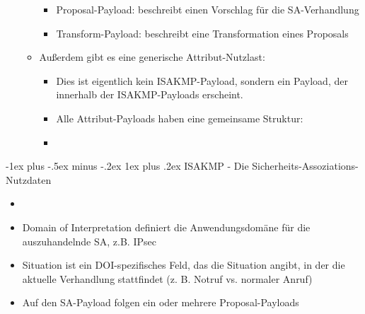 \documentclass[a4paper]{article}
\makeatletter
\renewcommand{\subsubsection}{\@startsection{subsubsection}{3}{0mm}%
 {-1ex plus -.5ex minus -.2ex}%
 {1ex plus .2ex}%
 {\normalfont\small\bfseries}}
\makeatother
\begin{document}
\begin{multicols}{3}
\begin{itemize}
\begin{itemize}
                        \begin{itemize}
                            \item
                                  Proposal-Payload: beschreibt einen Vorschlag für die
                                  SA-Verhandlung
                            \item
                                  Transform-Payload: beschreibt eine Transformation eines Proposals
                        \end{itemize}
                  \item
                        Außerdem gibt es eine generische Attribut-Nutzlast:

                        \begin{itemize}
                            \item
                                  Dies ist eigentlich kein ISAKMP-Payload, sondern ein Payload, der
                                  innerhalb der ISAKMP-Payloads erscheint.
                            \item
                                  Alle Attribut-Payloads haben eine gemeinsame Struktur:
                            \item
                        \end{itemize}
              \end{itemize}
    \end{itemize}


    \subsubsection{ISAKMP - Die
        Sicherheits-Assoziations-Nutzdaten}

    \begin{itemize}
        \item
        \item
              Domain of Interpretation definiert die Anwendungsdomäne für die
              auszuhandelnde SA, z.B. IPsec
        \item
              Situation ist ein DOI-spezifisches Feld, das die Situation angibt, in
              der die aktuelle Verhandlung stattfindet (z. B. Notruf vs. normaler
              Anruf)
        \item
              Auf den SA-Payload folgen ein oder mehrere Proposal-Payloads
    \end{itemize}



\end{multicols}
\end{document}
